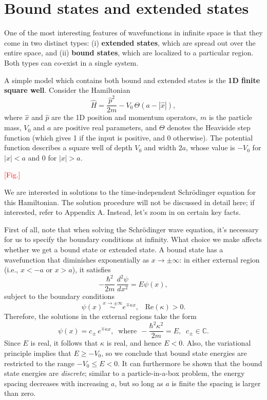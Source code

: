 \documentclass[pra,11pt]{revtex4}
\begin{document}
\section{Bound states and extended states}

One of the most interesting features of wavefunctions in infinite
space is that they come in two distinct types: (i) \textbf{extended
  states}, which are spread out over the entire space, and (ii)
\textbf{bound states}, which are localized to a particular region.
Both types can co-exist in a single system.

A simple model which contains both bound and extended states is the
\textbf{1D finite square well}.  Consider the Hamiltonian
$$\hat{H} = \frac{\hat{p}^2}{2m} - V_0 \,\Theta(a -|\hat{x}|),$$
where $\hat{x}$ and $\hat{p}$ are the 1D position and momentum
operators, $m$ is the particle mass, $V_0$ and $a$ are positive real
parameters, and $\Theta$ denotes the Heaviside step function (which
gives 1 if the input is positive, and 0 otherwise).  The potential
function describes a square well of depth $V_0$ and width $2a$, whose
value is $-V_0$ for $|x| < a$ and $0$ for $|x|>a$.

\textcolor{red}{[Fig.]}

We are interested in solutions to the time-independent Schr\"odinger
equation for this Hamiltonian.  The solution procedure will not be
discussed in detail here; if interested, refer to Appendix A.
Instead, let's zoom in on certain key facts.

First of all, note that when solving the Schr\"odinger wave equation,
it's necessary for us to specify the boundary conditions at infinity.
What choice we make affects whether we get a bound state or extended
state.  A bound state has a wavefunction that diminishes exponentially
as $x \rightarrow \pm\infty$: in either external region (i.e., $x <
-a$ or $x > a$), it satisfies
$$-\frac{\hbar^2}{2m}\,\frac{d^2\psi}{dx^2} = E \psi(x),$$
subject to the boundary conditions
$$\psi(x) \overset{x\rightarrow\pm\infty}{\sim} e^{\mp\kappa x}, \;\;\;\mathrm{Re}(\kappa) > 0.$$
Therefore, the solutions in the external regions take the form
$$\psi(x) = c_\pm\, e^{\mp\kappa x}, \;\;\mathrm{where}\;\, -\frac{\hbar^2\kappa^2}{2m} = E, \;\; c_\pm \in \mathbb{C}.$$
Since $E$ is real, it follows that $\kappa$ is real, and hence $E <
0$.  Also, the variational principle implies that $E \ge -V_0$, so we
conclude that bound state energies are restricted to the range $-V_0
\le E < 0$.  It can furthermore be shown that the bound state energies
are \textit{discrete}; similar to a particle-in-a-box problem, the
energy spacing decreases with increasing $a$, but so long as $a$ is
finite the spacing is larger than zero.
\end{document}
